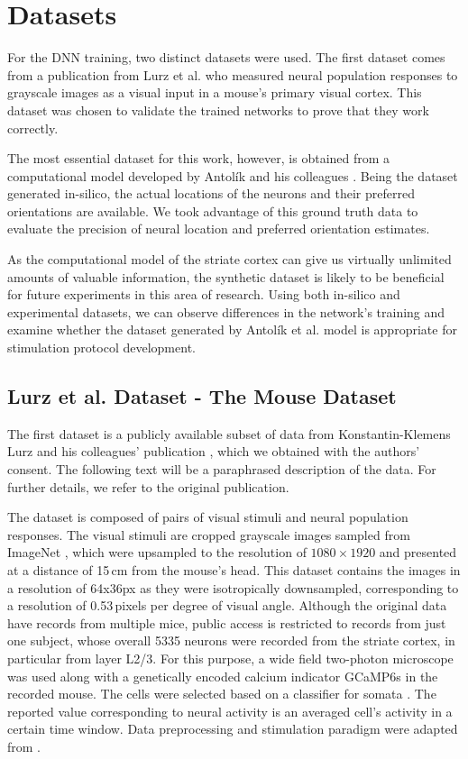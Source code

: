 \section{Datasets}

For the DNN training, two distinct datasets were used. The first dataset comes from a publication from Lurz et al. \citep{lurz2021generalization} who measured neural population responses to grayscale images as a visual input in a mouse's primary visual cortex. This dataset was chosen to validate the trained networks to prove that they work correctly.

The most essential dataset for this work, however, is obtained from a computational model developed by Antolík and his colleagues \citep{antolik2019comprehensive}. Being the dataset generated in-silico, the actual locations of the neurons and their preferred orientations are available. We took advantage of this ground truth data to evaluate the precision of neural location and preferred orientation estimates.

As the computational model of the striate cortex can give us virtually unlimited amounts of valuable information, the synthetic dataset is likely to be beneficial for future experiments in this area of research. Using both in-silico and experimental datasets, we can observe differences in the network’s training and examine whether the dataset generated by Antolík et al. model is appropriate for stimulation protocol development.

\subsection{Lurz et al. Dataset - The Mouse Dataset}

The first dataset is a publicly available subset of data from Konstantin-Klemens Lurz and his colleagues' publication \citep{lurz2021generalization}, which we obtained with the authors' consent. The following text will be a paraphrased description of the data. For further details, we refer to the original publication.

The dataset is composed of pairs of visual stimuli and neural population responses. The visual stimuli are cropped grayscale images sampled from ImageNet \citep{deng2009imagenet}, which were upsampled to the resolution of $1080 \times 1920$ and presented at a distance of 15\,cm from the mouse’s head. This dataset contains the images in a resolution of 64x36px as they were isotropically downsampled, corresponding to a resolution of 0.53\,pixels per degree of visual angle. Although the original data have records from multiple mice, public access is restricted to records from just one subject, whose overall 5335 neurons were recorded from the striate cortex, in particular from layer L2/3. For this purpose, a wide field two-photon microscope \citep{sofroniew2016large} was used along with a genetically encoded calcium indicator GCaMP6s in the recorded mouse. The cells were selected based on a classifier for somata \citep{pnevmatikakis2016simultaneous}. The reported value corresponding to neural activity is an averaged cell’s activity in a certain time window. Data preprocessing and stimulation paradigm were adapted from \citep{walker2019inception}.

